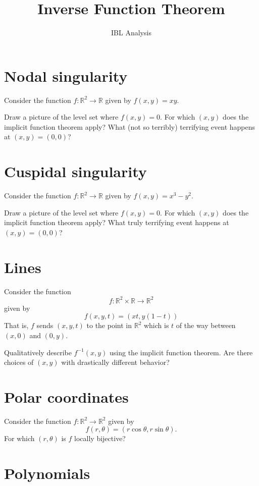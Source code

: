 \documentclass[12pt]{article}
\title{Inverse Function Theorem}
\author{IBL Analysis}
\newcommand{\R}{\mathbb{R}}
\begin{document}
\maketitle

\section{Nodal singularity}

Consider the function $f : \R^2 \to \R$ given by $f(x,y) = xy$.

Draw a picture of the level set where $f(x,y) = 0$.  For which $(x,y)$
does the implicit function theorem apply?  What (not so terribly) terrifying
event happens at $(x,y) = (0,0)$?

\section{Cuspidal singularity}

Consider the function $f : \R^2 \to \R$ given by $f(x,y) = x^3 - y^2$.

Draw a picture of the level set where $f(x,y) = 0$.  For which $(x,y)$
does the implicit function theorem apply?  What truly terrifying event
happens at $(x,y) = (0,0)$?

\section{Lines}

Consider the function
$$
f : \R^2 \times \R \to \R^2
$$
given by
$$
f(x,y,t) = (x t, y (1-t))
$$
That is, $f$ sends $(x,y,t)$ to the point in $\R^2$ which is $t$ of the way between $(x,0)$ and $(0,y)$.

Qualitatively describe $f^{-1}(x,y)$ using the implicit function
theorem.  Are there choices of $(x,y)$ with drastically different
behavior?

\section{Polar coordinates}

Consider the function $f : \R^2 \to \R^2$ given by
$$
f(r,\theta) = (r \cos \theta, r \sin \theta).
$$
For which $(r,\theta)$ is $f$ locally bijective?

\section{Polynomials}
\end{document}
